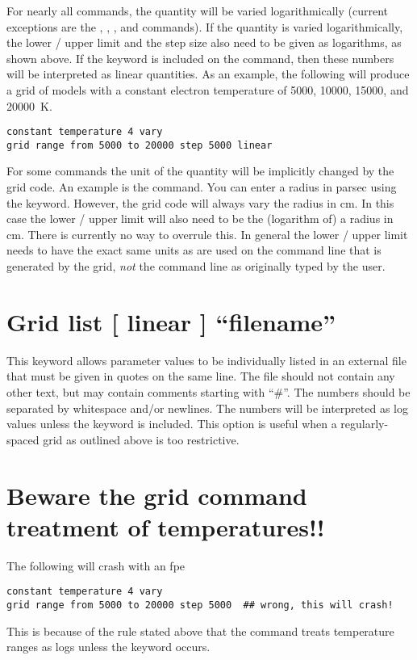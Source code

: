 For nearly all commands, the quantity will be varied logarithmically (current
exceptions are the , ,
, and  commands). If the quantity is varied
logarithmically, the lower / upper limit and the step size also need to be
given as logarithms, as shown above. If the keyword  is
included on the  command, then these numbers will be
interpreted as linear quantities. As an example, the following will produce a
grid of models with a constant electron temperature of 5000, 10000, 15000, and
20000~K.
\begin{verbatim}
constant temperature 4 vary
grid range from 5000 to 20000 step 5000 linear
\end{verbatim}

For some commands the unit of the quantity will be implicitly changed by the
grid code. An example is the  command. You can enter a
radius in parsec using the  keyword. However, the grid code
will always vary the radius in cm. In this case the lower / upper limit will
also need to be the (logarithm of) a radius in cm. There is currently no way
to overrule this. In general the lower / upper limit needs to have the exact
same units as are used on the command line that is generated by the grid,
\emph{not} the command line as originally typed by the user.

\section{Grid list [ linear ] ``filename''}

This  keyword allows parameter values to be individually
listed in an external file that must be given in quotes on the same line. The
file should not contain any other text, but may contain comments starting with ``\#''. The numbers should
be separated by whitespace and/or newlines. The numbers will be interpreted as
log values unless the  keyword is included. This option is
useful when a regularly-spaced grid as outlined above is too restrictive.

\section{Beware the grid command treatment of temperatures!!}
\label{sec:GridTemperatureGotcha}
The following will crash with an fpe
\begin{verbatim}
constant temperature 4 vary
grid range from 5000 to 20000 step 5000  ## wrong, this will crash!
\end{verbatim}
This is because of the rule stated above that the  command
treats temperature ranges as logs unless the keyword
 occurs.  


